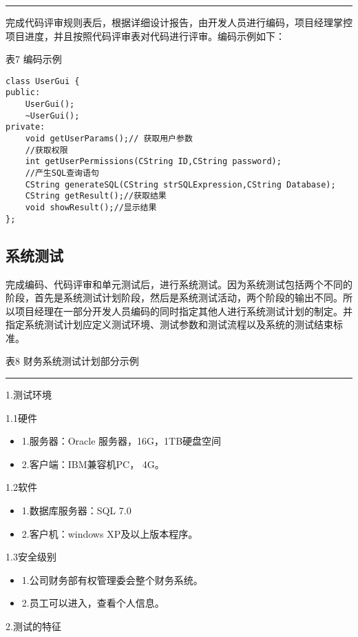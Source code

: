 \documentclass[UTF8,nofonts]{ctexart}
\begin{document}
\noindent\rule[0.25\baselineskip]{\textwidth}{2pt}
完成代码评审规则表后，根据详细设计报告，由开发人员进行编码，项目经理掌控项目进度，并且按照代码评审表对代码进行评审。编码示例如下：
\begin{center}
	表7 编码示例
\end{center}
\begin{lstlisting}[language={[ANSI]C++}]
class UserGui {
public:
	UserGui();
	~UserGui();
private:	
	void getUserParams();// 获取用户参数
	//获取权限
	int getUserPermissions(CString ID,CString password);
	//产生SQL查询语句
	CString generateSQL(CString strSQLExpression,CString Database);
	CString getResult();//获取结果
	void showResult();//显示结果
};
\end{lstlisting}
\subsection{系统测试} %
\label{ssub:系统测试_}
完成编码、代码评审和单元测试后，进行系统测试。因为系统测试包括两个不同的阶段，首先是系统测试计划阶段，然后是系统测试活动，两个阶段的输出不同。所以项目经理在一部分开发人员编码的同时指定其他人进行系统测试计划的制定。并指定系统测试计划应定义测试环境、测试参数和测试流程以及系统的测试结束标准。
\begin{center}
	表8 财务系统测试计划部分示例
\end{center}
\noindent\rule[0.25\baselineskip]{\textwidth}{2pt}
1.测试环境

1.1硬件
\begin{itemize}
\setlength{\itemsep}{0pt}
\setlength{\parskip}{0pt}
\setlength{\parsep}{0pt}
	\item 1.服务器：Oracle 服务器，16G，1TB硬盘空间
	\item 2.客户端：IBM兼容机PC， 4G。
\end{itemize}

1.2软件
\begin{itemize}
\setlength{\itemsep}{0pt}
\setlength{\parskip}{0pt}
\setlength{\parsep}{0pt}
	\item 1.数据库服务器：SQL 7.0
	\item 2.客户机：windows XP及以上版本程序。
\end{itemize}

1.3安全级别
\begin{itemize}
\setlength{\itemsep}{0pt}
\setlength{\parskip}{0pt}
\setlength{\parsep}{0pt}
	\item 1.公司财务部有权管理委会整个财务系统。
	\item 2.员工可以进入，查看个人信息。
\end{itemize}
2.测试的特征
\end{document}
